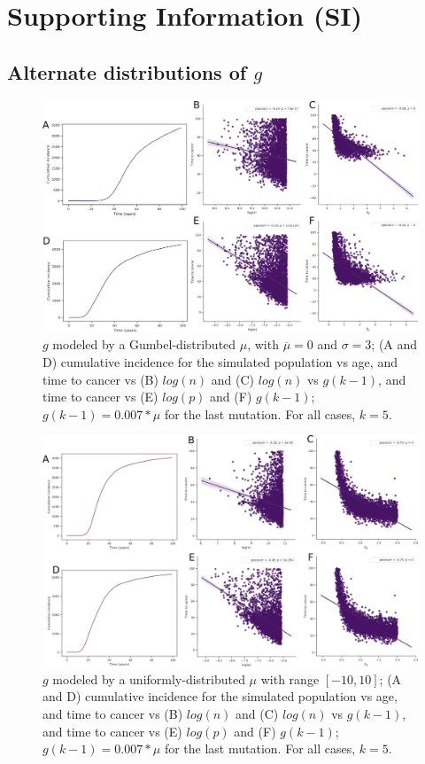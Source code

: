 \documentclass[9pt,onecolumn,twoside]{pnas-new}
\begin{document}
\section*{Supporting Information (SI)}
	\renewcommand{\thesubsection}{S\arabic{subsection}}
	\setcounter{subsection}{0} 	

	\subsection{Alternate distributions of $g$}\label{S1 Figures}
		\renewcommand{\thefigure}{S1.\arabic{figure}}
		\setcounter{figure}{0} 	
		\begin{figure}[tbhp]
			\centering
			\includegraphics[width=.8\linewidth]{figS1-1.png}
			\caption{$g$ modeled by a Gumbel-distributed $\mu$, with $\overline{\mu}=0$ and $\sigma=3$; (A and D) cumulative incidence for the simulated population vs age, and time to cancer vs (B) $log(n)$ and (C) $log(n)$ vs $g(k-1)$, and time to cancer vs (E) $log(p)$ and (F) $g(k-1)$; $g(k-1) = 0.007*\mu$ for the last mutation. For all cases, $k=5$.}
			\label{figS1.1}
		\end{figure}

		\begin{figure}[tbhp]
			\centering
			\includegraphics[width=.8\linewidth]{figS1-2.png}
			\caption{$g$ modeled by a uniformly-distributed $\mu$ with range $[-10, 10]$; (A and D) cumulative incidence for the simulated population vs age, and time to cancer vs (B) $log(n)$ and (C) $log(n)$ vs $g(k-1)$, and time to cancer vs (E) $log(p)$ and (F) $g(k-1)$; $g(k-1) = 0.007*\mu$ for the last mutation. For all cases, $k=5$.}
			\label{figS1.2}
		\end{figure}
\end{document}
